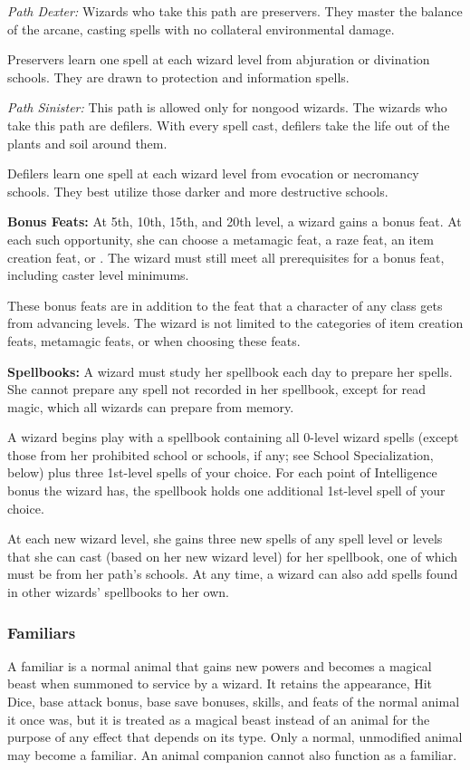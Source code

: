 \textit{Path Dexter:} Wizards who take this path are preservers. They master the balance of the arcane, casting spells with no collateral environmental damage.

Preservers learn one spell at each wizard level from abjuration or divination schools. They are drawn to protection and information spells.

\textit{Path Sinister:} This path is allowed only for nongood wizards. The wizards who take this path are defilers. With every spell cast, defilers take the life out of the plants and soil around them.

Defilers learn one spell at each wizard level from evocation or necromancy schools. They best utilize those darker and more destructive schools.

\textbf{Bonus Feats:} At 5th, 10th, 15th, and 20th level, a wizard gains a bonus feat. At each such opportunity, she can choose a metamagic feat, a raze feat, an item creation feat, or . The wizard must still meet all prerequisites for a bonus feat, including caster level minimums.

These bonus feats are in addition to the feat that a character of any class gets from advancing levels. The wizard is not limited to the categories of item creation feats, metamagic feats, or  when choosing these feats.

\textbf{Spellbooks:} A wizard must study her spellbook each day to prepare her spells. She cannot prepare any spell not recorded in her spellbook, except for read magic, which all wizards can prepare from memory.

A wizard begins play with a spellbook containing all 0-level wizard spells (except those from her prohibited school or schools, if any; see School Specialization, below) plus three 1st-level spells of your choice. For each point of Intelligence bonus the wizard has, the spellbook holds one additional 1st-level spell of your choice.

At each new wizard level, she gains three new spells of any spell level or levels that she can cast (based on her new wizard level) for her spellbook, one of which must be from her path's schools. At any time, a wizard can also add spells found in other wizards' spellbooks to her own.

\subsubsection{Familiars}
A familiar is a normal animal that gains new powers and becomes a magical beast when summoned to service by a wizard. It retains the appearance, Hit Dice, base attack bonus, base save bonuses, skills, and feats of the normal animal it once was, but it is treated as a magical beast instead of an animal for the purpose of any effect that depends on its type. Only a normal, unmodified animal may become a familiar. An animal companion cannot also function as a familiar.

